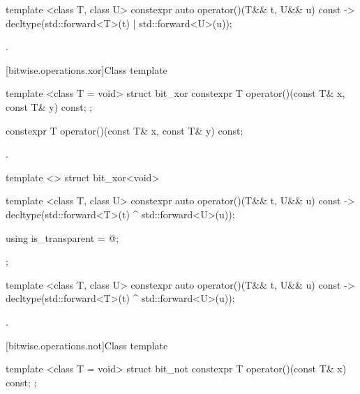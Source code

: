 %
\begin{itemdecl}
template <class T, class U> constexpr auto operator()(T&& t, U&& u) const
    -> decltype(std::forward<T>(t) | std::forward<U>(u));
\end{itemdecl}

\begin{itemdescr}
\pnum\returns {}.
\end{itemdescr}

[bitwise.operations.xor]{Class template }

%
\begin{itemdecl}
template <class T = void> struct bit_xor {
  constexpr T operator()(const T& x, const T& y) const;
};
\end{itemdecl}

%
\begin{itemdecl}
constexpr T operator()(const T& x, const T& y) const;
\end{itemdecl}

\begin{itemdescr}
\pnum\returns {}.
\end{itemdescr}

%
\begin{itemdecl}
template <> struct bit_xor<void> {
  template <class T, class U> constexpr auto operator()(T&& t, U&& u) const
    -> decltype(std::forward<T>(t) ^ std::forward<U>(u));

  using is_transparent = @\unspec@;
};
\end{itemdecl}

%
\begin{itemdecl}
template <class T, class U> constexpr auto operator()(T&& t, U&& u) const
    -> decltype(std::forward<T>(t) ^ std::forward<U>(u));
\end{itemdecl}

\begin{itemdescr}
\pnum\returns {}.
\end{itemdescr}

[bitwise.operations.not]{Class template }

\begin{itemdecl}
template <class T = void> struct bit_not {
  constexpr T operator()(const T& x) const;
};
\end{itemdecl}

